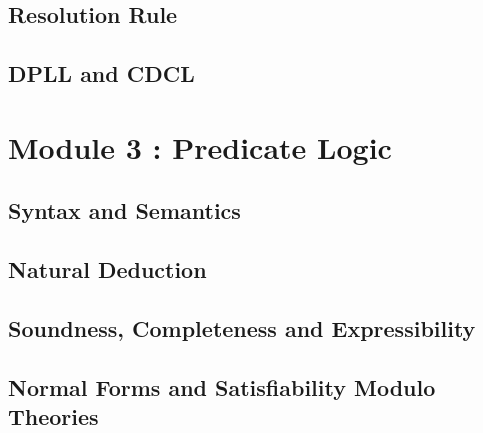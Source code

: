 \documentclass[4pt, aspectratio=169]{beamer} %
\begin{document}
{
 
}
\subsection{Resolution Rule}
{
 
}
\subsection{DPLL and CDCL}
{
 
}
\section{Module 3 : Predicate Logic}

{
 
}
\subsection{Syntax and Semantics}
{
 
}
\subsection{Natural Deduction}
{
 
}
\subsection{Soundness, Completeness and Expressibility}
{
 
}
\subsection{Normal Forms and Satisfiability Modulo Theories}
{
 
}
\end{document}
